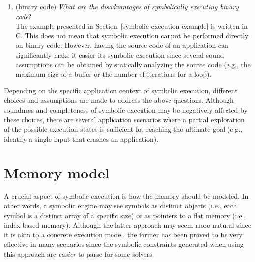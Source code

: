 \begin{enumerate}
  \item (binary code) {\em What are the disadvantages of symbolically executing binary code}? \\
  The example presented in Section~\ref{symbolic-execution-example} is written in C. This does not mean that symbolic execution cannot be performed directly on binary code. However, having the source code of an application can significantly make it easier its symbolic execution since several sound assumptions can be obtained by statically analyzing the source code (e.g., the maximum size of a buffer or the number of iterations for a loop).
   
\end{enumerate}
Depending on the specific application context of symbolic execution, different choices and assumptions are made to address the above questions. Although soundness and completeness of symbolic execution may be negatively affected by these choices, there are several application scenarios where a partial exploration of the possible execution states is sufficient for reaching the ultimate goal (e.g., identify a single input that crashes an application).


\section{Memory model}
A crucial aspect of symbolic execution is how the memory should be modeled. In other words, a symbolic engine may see symbols as distinct objects (i.e., each symbol is a distinct array of a specific size) or as pointers to a flat memory (i.e., index-based memory). Although the latter approach may seem more natural since it is akin to a concrete execution model, the former has been proved to be very effective in many scenarios since the symbolic constraints generated when using this approach are {\em easier} to parse for some solvers.

